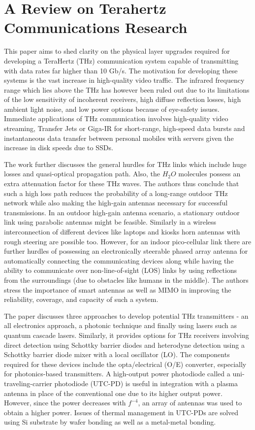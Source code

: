 \documentclass[12pt, letterpaper]{article}
\begin{document}
\section{A Review on Terahertz Communications Research}
\par
This paper aims to shed clarity on the physical layer upgrades required for developing a TeraHertz (THz) communication system capable of transmitting with data rates far higher than 10 Gb/s. The motivation for developing these systems is the vast increase in high-quality video traffic.  The infrared frequency range which lies above the THz has however been ruled out due to its limitations of the low sensitivity of incoherent receivers, high diffuse reflection losses, high ambient light noise, and low power options because of eye-safety issues. Immediate applications of THz communication involves high-quality video streaming, Transfer Jets or Giga-IR for short-range, high-speed data bursts and instantaneous data transfer between personal mobiles with servers given the increase in disk speeds due to SSDs. 
\par
The work further discusses the general hurdles for THz links which include huge losses and quasi-optical propagation path. Also, the $H_2O$ molecules possess an extra attenuation factor for these THz waves. The authors thus conclude that such a high loss path reduces the probability of a long-range outdoor THz network while also making the high-gain antennas necessary for successful transmissions. In an outdoor high-gain antenna scenario, a stationary outdoor link using parabolic antennas might be feasible. Similarly in a wireless interconnection of different devices like laptops and kiosks horn antennas with rough steering are possible too. However, for an indoor pico-cellular link there are further hurdles of possessing an electronically steerable phased array antenna for automatically connecting the communicating devices along while having the ability to communicate over non-line-of-sight (LOS) links by using reflections from the surroundings (due to obstacles like humans in the middle). The authors stress the importance of smart antennas as well as MIMO in improving the reliability, coverage, and capacity of such a system.  
\par
The paper discusses three approaches to develop potential THz transmitters - an all electronics approach, a photonic technique and finally using lasers such as quantum cascade lasers. Similarly, it provides options for THz receivers involving direct detection using Schottky barrier diodes and heterodyne detection using a Schottky barrier diode mixer with a local oscillator (LO). The components required for these devices include the opta/electrical (O/E) converter, especially for photonics-based transmitters. A high-output power photodiode called a uni-traveling-carrier photodiode (UTC-PD) is useful in integration with a plasma antenna in place of the conventional one due to its higher output power. However, since the power decreases with $f^{-4}$, an array of antennas was used to obtain a higher power. Issues of thermal management in UTC-PDs are solved using Si substrate by wafer bonding as well as a metal-metal bonding.
\end{document}
